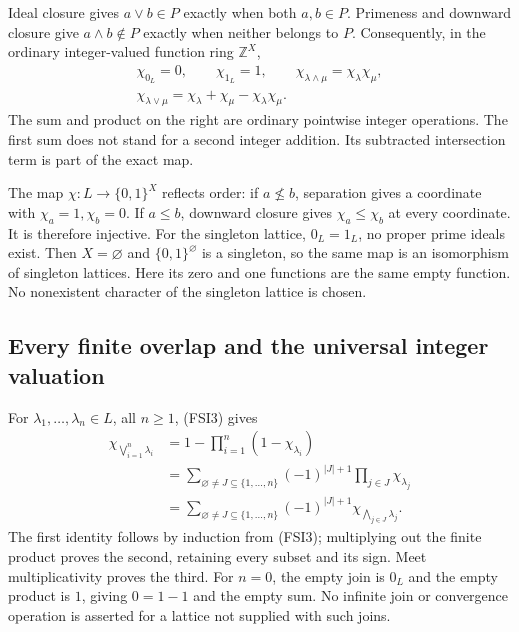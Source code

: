 Ideal closure gives
\(a\vee b\in P\) exactly when both \(a,b\in P\).
Primeness and downward closure give
\(a\wedge b\notin P\) exactly when neither belongs to \(P\).
Consequently, in the ordinary integer-valued function ring
\(\mathbb Z^X\),
\begin{equation}\tag{FSI3}
\begin{gathered}
\chi_{0_L}=0,\qquad \chi_{1_L}=1,\qquad
\chi_{\lambda\wedge\mu}=\chi_\lambda\chi_\mu,\\
\chi_{\lambda\vee\mu}
=\chi_\lambda+\chi_\mu-\chi_\lambda\chi_\mu .
\end{gathered}
\end{equation}
The sum and product on the right are ordinary pointwise integer
operations. The first sum does not stand for a second integer
addition. Its subtracted intersection term is part of the exact map.

The map \(\chi:L\to\{0,1\}^X\) reflects order:
if \(a\not\le b\), separation gives a coordinate with
\(\chi_a=1,\chi_b=0\). If \(a\le b\), downward closure gives
\(\chi_a\le\chi_b\) at every coordinate. It is therefore injective.
For the singleton lattice, \(0_L=1_L\), no proper prime ideals exist.
Then \(X=\varnothing\) and \(\{0,1\}^{\varnothing}\) is a singleton,
so the same map is an isomorphism of singleton lattices.
Here its zero and one functions are the same empty function.
No nonexistent character of the singleton lattice is chosen.

\subsection{Every finite overlap and the universal integer valuation}

For \(\lambda_1,\ldots,\lambda_n\in L\), all \(n\ge1\), (FSI3) gives
\begin{equation}\tag{FSI4}
\begin{split}
\chi_{\bigvee_{i=1}^n\lambda_i}
&=1-\prod_{i=1}^n(1-\chi_{\lambda_i})\\
&=\sum_{\varnothing\ne J\subseteq\{1,\ldots,n\}}
(-1)^{|J|+1}\prod_{j\in J}\chi_{\lambda_j}\\
&=\sum_{\varnothing\ne J\subseteq\{1,\ldots,n\}}
(-1)^{|J|+1}\chi_{\bigwedge_{j\in J}\lambda_j}.
\end{split}
\end{equation}
The first identity follows by induction from (FSI3); multiplying out
the finite product proves the second, retaining every subset and
its sign. Meet multiplicativity proves the third.
For \(n=0\), the empty join is \(0_L\) and the empty product is \(1\),
giving \(0=1-1\) and the empty sum. No infinite join or convergence
operation is asserted for a lattice not supplied with such joins.

